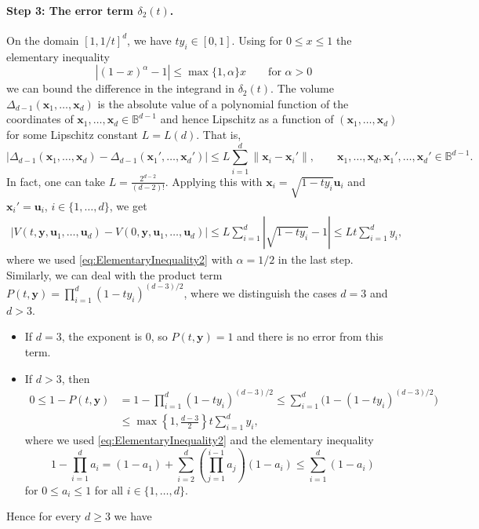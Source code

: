 \documentclass[11pt,a4paper]{article}
\theoremstyle{plain}
\theoremstyle{definition}
\theoremstyle{remark}
\newcommand{\bx}{\boldsymbol{x}}
\newcommand{\by}{\boldsymbol{y}}
\newcommand{\bu}{\boldsymbol{u}}
\def\BB{\mathbb{B}}
\begin{document}
\paragraph{Step 3: The error term $\delta_2(t)$.} On the domain $[1, 1/t]^d$, we have $t y_i \in [0,1]$.
Using for $0\leq x\leq 1$ the elementary inequality
\begin{equation}\label{eq:ElementaryInequality2}
	|(1-x)^\alpha - 1| \le \max\{1,\alpha\} x\qquad\text{for $\alpha > 0$}
\end{equation}
we can bound the difference in the integrand in $\delta_2(t)$.
The volume $\Delta_{d-1}(\bx_1,\ldots,\bx_d)$ is the absolute value of a polynomial function of the coordinates of $\bx_1,\ldots,\bx_d\in\BB^{d-1}$ and hence Lipschitz as a function of $(\bx_1,\ldots,\bx_d)$ for some Lipschitz constant $L=L(d)$. That is,
$$
	|\Delta_{d-1}(\bx_1,\ldots,\bx_d)-\Delta_{d-1}(\bx_1',\ldots,\bx_d')| \leq L\sum_{i=1}^d\|\bx_i-\bx_i'\|,\qquad \bx_1,\ldots,\bx_d,\bx_1',\ldots,\bx_d'\in\BB^{d-1}.
$$
In fact, one can take $L=\frac{2^{d-2}}{(d-2)!}$.
Applying this with $\bx_i=\sqrt{1-ty_i}\bu_i$ and $\bx_i'=\bu_i$, $i\in\{1,\ldots,d\}$, we get
\begin{align*}
	|V(t,\by,\bu_1,\dotsc,\bu_d) - V(0,\by,\bu_1,\dotsc,\bu_d)|
	\le
	L \sum_{i=1}^d |\sqrt{1-ty_i} - 1|
	\le
	L t \sum_{i=1}^d y_i,
\end{align*}
where we used \eqref{eq:ElementaryInequality2} with $\alpha=1/2$ in the last step.
Similarly, we can deal with the product term $P(t,\by) = \prod_{i=1}^d (1-ty_i)^{(d-3)/2}$, where we distinguish the cases $d=3$ and $d>3$.
\begin{itemize}
	\item If $d=3$, the exponent is 0, so $P(t,\by)=1$ and there is no error from this term.
	\item If $d > 3$, then
	      \begin{align*}
		      0\leq 1-P(t,\by)
		       & = 1-\prod_{i=1}^d (1-ty_i)^{(d-3)/2}
		      \leq \sum_{i=1}^d \Big(1-(1-ty_i)^{(d-3)/2}\Big)               \\
		       & \leq \max\left\{1,\frac{d-3}{2}\right\} t \sum_{i=1}^d y_i,
	      \end{align*}
	      where we used \eqref{eq:ElementaryInequality2} and the elementary inequality
	      \[
		      1-\prod_{i=1}^d a_i = (1-a_1) + \sum_{i=2}^d \left(\prod_{j=1}^{i-1} a_j\right) (1-a_i) \leq \sum_{i=1}^d (1-a_i)
	      \]
	      for $0\leq a_i\leq 1$ for all $i\in\{1,\ldots,d\}$.
\end{itemize}
Hence for every $d\geq 3$ we have
\end{document}
